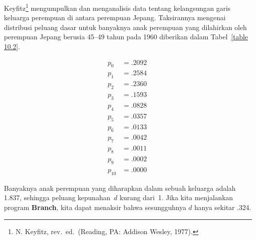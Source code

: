 \begin{example}\label{exam 10.2.3}
Keyfitz\footnote{N. Keyfitz,  rev.~ed.\ (Reading, PA: Addison Wesley, 1977).} mengumpulkan dan
menganalisis data tentang kelangsungan garis keluarga perempuan di antara perempuan
Jepang.  Taksirannya mengenai distribusi peluang dasar untuk banyaknya
anak perempuan yang dilahirkan oleh perempuan Jepang berusia 45--49 tahun pada 1960 diberikan dalam Tabel~\ref{table 10.2}.
\begin{table}
\centering
$$\begin{array}{rl}
p_0 &= .2092 \\
p_1 &= .2584 \\
p_2 &= .2360 \\
p_3 &= .1593 \\
p_4 &= .0828 \\
p_5 &= .0357 \\
p_6 &= .0133 \\
p_7 &= .0042 \\
p_8 &= .0011 \\
p_9 &= .0002 \\
p_{10} &= .0000\  
\end{array}
$$
\caption{Distribusi banyaknya anak perempuan.}
\label{table 10.2}
\end{table}

Banyaknya anak perempuan yang diharapkan dalam sebuah keluarga adalah 1.837, sehingga peluang
kepunahan~$d$ kurang dari~1.  Jika kita menjalankan program {\bf Branch}, kita dapat menaksir
bahwa sesungguhnya $d$ hanya sekitar .324.
\end{example}

